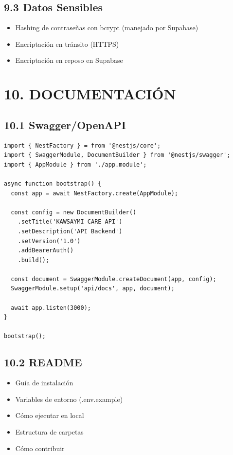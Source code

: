 \documentclass[12pt,a4paper]{article}
\begin{document}
\subsection{9.3 Datos Sensibles}

\begin{itemize}
    \item Hashing de contraseñas con bcrypt (manejado por Supabase)
    \item Encriptación en tránsito (HTTPS)
    \item Encriptación en reposo en Supabase
\end{itemize}

\section{10. DOCUMENTACIÓN}

\subsection{10.1 Swagger/OpenAPI}

\begin{verbatim}
import { NestFactory } = from '@nestjs/core';
import { SwaggerModule, DocumentBuilder } from '@nestjs/swagger';
import { AppModule } from './app.module';

async function bootstrap() {
  const app = await NestFactory.create(AppModule);
  
  const config = new DocumentBuilder()
    .setTitle('KAWSAYMI CARE API')
    .setDescription('API Backend')
    .setVersion('1.0')
    .addBearerAuth()
    .build();
    
  const document = SwaggerModule.createDocument(app, config);
  SwaggerModule.setup('api/docs', app, document);

  await app.listen(3000);
}

bootstrap();
\end{verbatim}

\subsection{10.2 README}

\begin{itemize}
    \item Guía de instalación
    \item Variables de entorno (.env.example)
    \item Cómo ejecutar en local
    \item Estructura de carpetas
    \item Cómo contribuir
\end{itemize}
\end{document}
